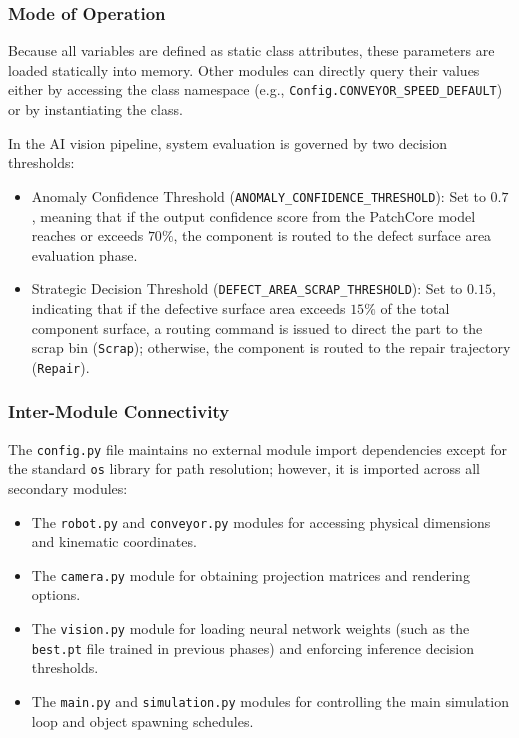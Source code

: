 \documentclass{article}
\begin{document}
\subsubsection{Mode of Operation}
Because all variables are defined as static class attributes, these parameters are loaded statically into memory. Other modules can directly query their values either by accessing the class namespace (e.g., \texttt{Config.CONVEYOR\_SPEED\_DEFAULT}) or by instantiating the class.

In the AI vision pipeline, system evaluation is governed by two decision thresholds:

\begin{itemize}
	\item Anomaly Confidence Threshold (\texttt{ANOMALY\_CONFIDENCE\_THRESHOLD}): Set to $0.7$, meaning that if the output confidence score from the PatchCore model reaches or exceeds $70\%$, the component is routed to the defect surface area evaluation phase.
	
	\item Strategic Decision Threshold (\texttt{DEFECT\_AREA\_SCRAP\_THRESHOLD}): Set to $0.15$, indicating that if the defective surface area exceeds $15\%$ of the total component surface, a routing command is issued to direct the part to the scrap bin (\texttt{Scrap}); otherwise, the component is routed to the repair trajectory (\texttt{Repair}).
\end{itemize}

\subsubsection{Inter-Module Connectivity}
The \texttt{config.py} file maintains no external module import dependencies except for the standard \texttt{os} library for path resolution; however, it is imported across all secondary modules:

\begin{itemize}
	\item The \texttt{robot.py} and \texttt{conveyor.py} modules for accessing physical dimensions and kinematic coordinates.
	\item The \texttt{camera.py} module for obtaining projection matrices and rendering options.
	\item The \texttt{vision.py} module for loading neural network weights (such as the \texttt{best.pt} file trained in previous phases) and enforcing inference decision thresholds.
	\item The \texttt{main.py} and \texttt{simulation.py} modules for controlling the main simulation loop and object spawning schedules.
\end{itemize}
\end{document}
